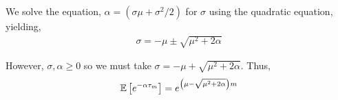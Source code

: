 \begin{solution}[Solution]
We solve the equation, \( \alpha = (\sigma\mu + \sigma^2/2) \) for \( \sigma \) using the quadratic equation, yielding,
\begin{align*}
    \sigma 
    = -\mu \pm \sqrt{\mu^2+2\alpha}
\end{align*}

However, \( \sigma,\alpha \geq 0 \) so we must take \( \sigma = -\mu + \sqrt{\mu^2+2\alpha} \).
Thus,
\begin{align*}
    \mathbb{E} \left[ e^{-\alpha \tau_m} \right] = e^{\left(\mu-\sqrt{\mu^2+2\alpha}\right)m}
\end{align*}

\end{solution}

